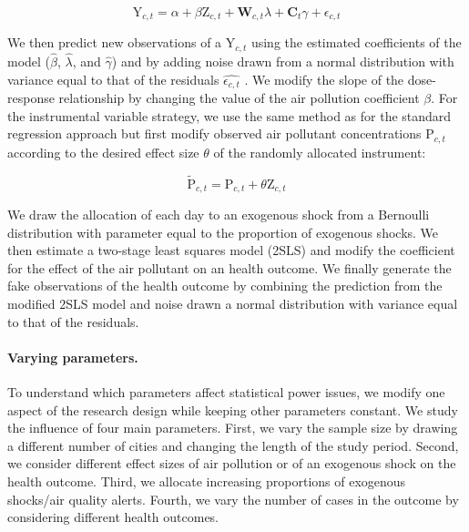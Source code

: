 \documentclass[12pt]{article}
\begin{document}
        \begin{equation*}
        \text{Y}_{c,t} = \alpha + \beta\text{Z}_{c,t} + \textbf{W}_{c,t}\lambda + \textbf{C}_{t}\gamma + \epsilon_{c,t}
        \end{equation*}
        
        \noindent We then predict new observations of a $\text{Y}_{c,t}$ using the estimated coefficients of the model ($\hat{\beta}$, $\hat{\lambda}$, and $\hat{\gamma}$) and by adding noise drawn from a normal distribution with variance equal to that of the residuals $\widehat{\epsilon_{c,t}}$ \citep{peng2006model}. We modify the slope of the dose-response relationship by changing the value of the air pollution coefficient $\beta$. For the instrumental variable strategy, we use the same method as for the standard regression approach but first modify observed air pollutant concentrations $\text{P}_{c,t}$ according to the desired effect size $\theta$ of the randomly allocated instrument: 
        
        \begin{equation*}
        \widetilde{\text{P}}_{c,t} = \text{P}_{c,t} + \theta\text{Z}_{c,t}
        \end{equation*}
        
        \noindent We draw the allocation of each day to an exogenous shock from a Bernoulli distribution with parameter equal to the proportion of exogenous shocks. We then estimate a two-stage least squares model (2SLS) and modify the coefficient for the effect of the air pollutant on an health outcome. We finally generate the fake observations of the health outcome by combining the prediction from the modified 2SLS model and noise drawn a normal distribution with variance equal to that of the residuals.
        
        \paragraph{Varying parameters.} To understand which parameters affect statistical power issues, we modify one aspect of the research design while keeping other parameters constant. We study the influence of four main parameters. First, we vary the sample size by drawing a different number of cities and changing the length of the study period. Second, we consider different effect sizes of air pollution or of an exogenous shock on the health outcome. Third, we allocate increasing proportions of exogenous shocks/air quality alerts. Fourth, we vary the number of cases in the outcome by considering different health outcomes.
\end{document}
